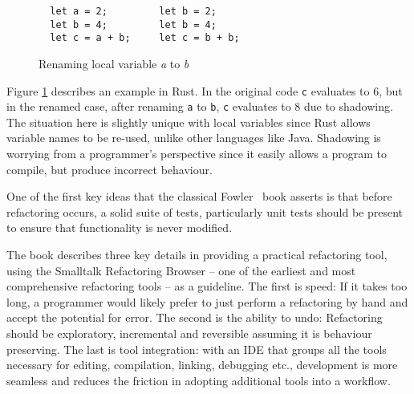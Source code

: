 \begin{figure}[h]
\begin{verbatim}
  let a = 2;         let b = 2;
  let b = 4;         let b = 4;
  let c = a + b;     let c = b + b;
\end{verbatim}
\caption{Renaming local variable \emph{a} to \emph{b}}
\label{Fig:opdyke}
\end{figure}

Figure \ref{Fig:opdyke} describes an example in Rust. In the original code {\verb|c|} evaluates to 6, but in the renamed case, after renaming {\verb|a|} to {\verb|b|}, {\verb|c|} evaluates to 8 due to shadowing. The situation here is slightly unique with local variables since Rust allows variable names to be re-used, unlike other languages like Java. Shadowing is worrying from a programmer's perspective since it easily allows a program to compile, but produce incorrect behaviour.

One of the first key ideas that the classical Fowler~\cite{fowler99} book asserts is that before refactoring occurs, a solid suite of tests, particularly unit tests should be present to ensure that functionality is never modified.

The book describes three key details in providing a practical refactoring tool, using the Smalltalk Refactoring Browser -- one of the earliest and most comprehensive refactoring tools -- as a guideline. The first is speed: If it takes too long, a programmer would likely prefer to just perform a refactoring by hand and accept the potential for error. The second is the ability to undo: Refactoring should be exploratory, incremental and reversible assuming it is behaviour preserving. The last is tool integration: with an IDE that groups all the tools necessary for editing, compilation, linking, debugging etc., development is more seamless and reduces the friction in adopting additional tools into a workflow.